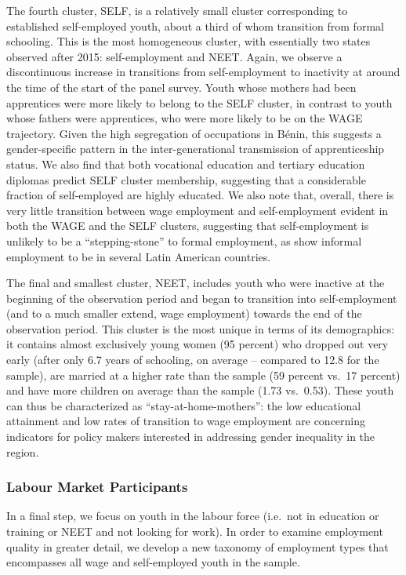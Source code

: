 \documentclass[
  a4paper, twoside, 12pt]{book}
\begin{document}
The fourth cluster, SELF, is a relatively small cluster corresponding to established self-employed youth, about a third of whom transition from formal schooling. This is the most homogeneous cluster, with essentially two states observed after 2015: self-employment and NEET. Again, we observe a discontinuous increase in transitions from self-employment to inactivity at around the time of the start of the panel survey. Youth whose mothers had been apprentices were more likely to belong to the SELF cluster, in contrast to youth whose fathers were apprentices, who were more likely to be on the WAGE trajectory. Given the high segregation of occupations in Bénin, this suggests a gender-specific pattern in the inter-generational transmission of apprenticeship status. We also find that both vocational education and tertiary education diplomas predict SELF cluster membership, suggesting that a considerable fraction of self-employed are highly educated. We also note that, overall, there is very little transition between wage employment and self-employment evident in both the WAGE and the SELF clusters, suggesting that self-employment is unlikely to be a ``stepping-stone'' to formal employment, as \textcite{cunningham2011} show informal employment to be in several Latin American countries.

The final and smallest cluster, NEET, includes youth who were inactive at the beginning of the observation period and began to transition into self-employment (and to a much smaller extend, wage employment) towards the end of the observation period. This cluster is the most unique in terms of its demographics: it contains almost exclusively young women (95 percent) who dropped out very early (after only 6.7 years of schooling, on average -- compared to 12.8 for the sample), are married at a higher rate than the sample (59 percent vs.~17 percent) and have more children on average than the sample (1.73 vs.~0.53). These youth can thus be characterized as ``stay-at-home-mothers'': the low educational attainment and low rates of transition to wage employment are concerning indicators for policy makers interested in addressing gender inequality in the region.

\hypertarget{labour-market-participants}{%
\subsubsection*{Labour Market Participants}\label{labour-market-participants}}

In a final step, we focus on youth in the labour force (i.e.~not in education or training or NEET and not looking for work). In order to examine employment quality in greater detail, we develop a new taxonomy of employment types that encompasses all wage and self-employed youth in the sample.
\end{document}
